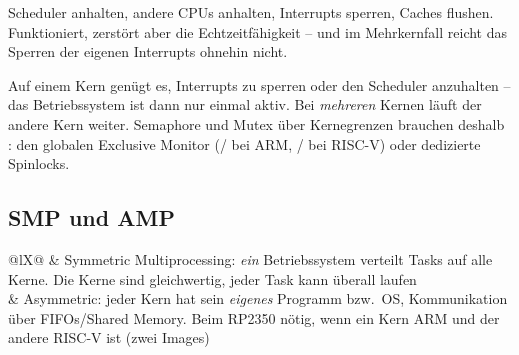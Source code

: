  Scheduler anhalten, andere CPUs anhalten,
Interrupts sperren, Caches flushen. Funktioniert, zerstört aber die
Echtzeitfähigkeit -- und im Mehrkernfall reicht das Sperren der eigenen
Interrupts ohnehin nicht.
\begin{falle}
Auf einem Kern genügt es, Interrupts zu sperren oder den Scheduler
anzuhalten -- das Betriebssystem ist dann nur einmal aktiv. Bei
\emph{mehreren} Kernen läuft der andere Kern weiter. Semaphore und
Mutex über Kernegrenzen brauchen deshalb :
den globalen Exclusive Monitor (/ bei ARM,
/ bei RISC-V) oder dedizierte Spinlocks.
\end{falle}

\subsection{SMP und AMP}
\label{rez:smpamp}
\begin{ztab}{@{}lX@{}}
 & Symmetric Multiprocessing: \emph{ein} Betriebssystem verteilt
  Tasks auf alle Kerne. Die Kerne sind gleichwertig, jeder Task kann
  überall laufen \\
 & Asymmetric: jeder Kern hat sein \emph{eigenes} Programm bzw.\
  OS, Kommunikation über FIFOs/Shared Memory. Beim RP2350 nötig, wenn
  ein Kern ARM und der andere RISC-V ist (zwei Images) \\
\end{ztab}

